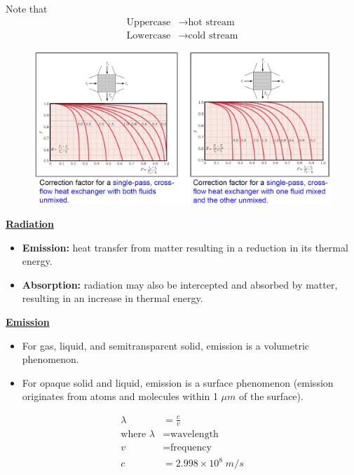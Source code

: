 \begin{itemize}
\begin{figure}[H]
    \end{figure}
    Note that
    \begin{align*}
        \text{Uppercase} &\rightarrow \text{hot stream} \\
        \text{Lowercase} &\rightarrow \text{cold stream}
    \end{align*}
    \begin{figure}[H]
        \centering
        \includegraphics[width=1.0\linewidth]{images/heat_exchanger_correction_factor_2.png}
    \end{figure}
\end{itemize}


\Large \textbf{\underline{Radiation}}


\begin{itemize}
    \item \color{blue} \textbf{Emission:} \color{black} heat transfer from matter resulting in a \color{blue} reduction in its thermal energy. \color{black} 
    \item \color{blue} \textbf{Absorption:} \color{black} radiation may also be intercepted and absorbed by matter, resulting in an increase in thermal energy.
\end{itemize}

\large \textbf{\underline{Emission}}


\begin{itemize}
    \item For gas, liquid, and semitransparent solid, \color{blue} emission \color{black} is a \color{blue} volumetric \color{black} phenomenon.
    \item For opaque solid and liquid, \color{blue} emission \color{black} is a \color{blue} surface phenomenon\color{black} (emission originates from atoms and molecules within 1 $\mu m$ of the surface).
\end{itemize}
\begin{align*}
    \lambda &= \frac{c}{v} \\
    \text{where } \lambda &= \text{wavelength} \\
    v &= \text{frequency} \\
    c &= 2.998\times 10^8 \; m/s
\end{align*}

